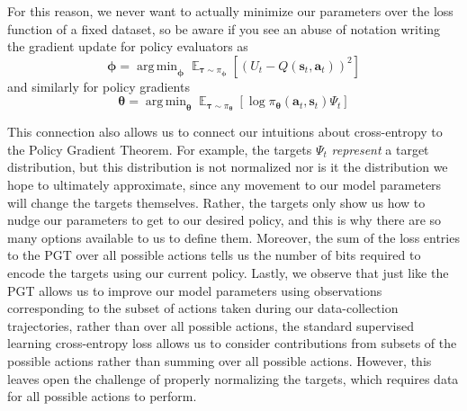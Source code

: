 \documentclass{article}
\DeclareMathOperator*{\argmin}{arg\,min}
\begin{document}
For this reason, we never want to actually minimize our parameters over the loss function of a fixed dataset, so be aware if you see an abuse of notation writing the gradient update for policy evaluators as \begin{equation}\boldsymbol{\phi}=\argmin_{\boldsymbol{\phi}}\mathop{\mathbb{E}}_{\boldsymbol{\tau}\sim\pi_{\boldsymbol{\phi}}}\left[\left(U_t-Q(\mathbf{s}_t,\mathbf{a}_t)\right)^2\right]\end{equation} and similarly for policy gradients \begin{equation}\boldsymbol{\theta}=\argmin_{\boldsymbol{\theta}}\mathop{\mathbb{E}}_{\boldsymbol{\tau}\sim\pi_{\boldsymbol{\theta}}}\left[\log\pi_{\boldsymbol{\theta}}(\mathbf{a}_t,\mathbf{s}_t)\Psi_t\right]\end{equation}

This connection also allows us to connect our intuitions about cross-entropy to the Policy Gradient Theorem. For example, the targets $\Psi_t$ \textit{represent} a target distribution, but this distribution is not normalized nor is it the distribution we hope to ultimately approximate, since any movement to our model parameters will change the targets themselves. Rather, the targets only show us how to nudge our parameters to get to our desired policy, and this is why there are so many options available to us to define them. Moreover, the sum of the loss entries to the PGT over all possible actions tells us the number of bits required to encode the targets using our current policy. Lastly, we observe that just like the PGT allows us to improve our model parameters using observations corresponding to the subset of actions taken during our data-collection trajectories, rather than over all possible actions, the standard supervised learning cross-entropy loss allows us to consider contributions from subsets of the possible actions rather than summing over all possible actions. However,  this leaves open the challenge of properly normalizing the targets, which requires data for all possible actions to perform.
\end{document}
